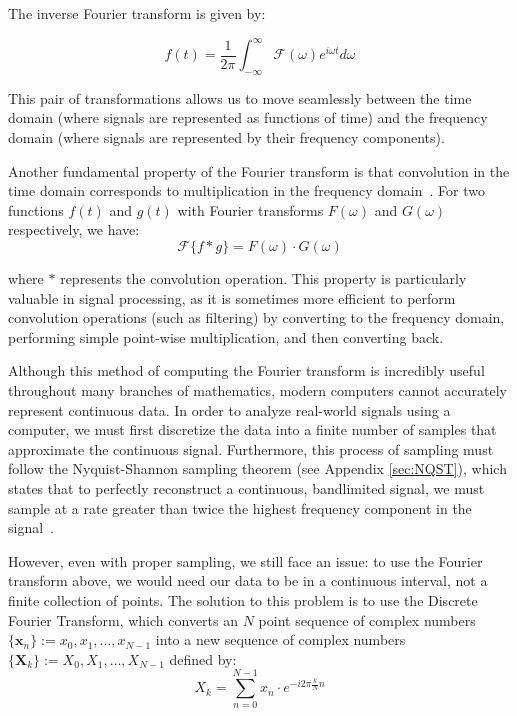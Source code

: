 \documentclass[11pt,twoside]{report}
\numberwithin{thm}{section}
\numberwithin{equation}{section}
\begin{document}
The inverse Fourier transform is given by:

\begin{equation}
  f(t) = \frac{1}{2\pi}\int_{-\infty}^{\infty} \mathcal{F}(\omega) e^{i\omega t} d\omega  
\end{equation}

This pair of transformations allows us to move seamlessly between the time domain (where signals are represented as functions of time) and the frequency domain (where signals are represented by their frequency components).

Another fundamental property of the Fourier transform is that convolution in the time domain corresponds to multiplication in the frequency domain~\cite{BLACKLEDGE200530}. For two functions $f(t)$ and $g(t)$ with Fourier transforms $F(\omega)$ and $G(\omega)$ respectively, we have:
\begin{equation}
\label{eq:conv}
  \mathcal{F}\{f \ast g\} = F(\omega) \cdot G(\omega)  
\end{equation}

where $\ast$ represents the convolution operation. This property is particularly valuable in signal processing, as it is sometimes more efficient to perform convolution operations (such as filtering) by converting to the frequency domain, performing simple point-wise multiplication, and then converting back.

Although this method of computing the Fourier transform is incredibly useful throughout many branches of mathematics, modern computers cannot accurately represent continuous data. In order to analyze real-world signals using a computer, we must first discretize the data into a finite number of samples that approximate the continuous signal. Furthermore, this process of sampling must follow the Nyquist-Shannon sampling theorem (see Appendix \ref{sec:NQST}), which states that to perfectly reconstruct a continuous, bandlimited signal, we must sample at a rate greater than twice the highest frequency component in the signal~\cite{Shannon1949}.

However, even with proper sampling, we still face an issue: to use the Fourier transform above, we would need our data to be in a continuous interval, not a finite collection of points. The solution to this problem is to use the Discrete Fourier Transform, which converts an $N$ point sequence of complex numbers $\{\mathbf{x}_n\} := x_0, x_1, \dots, x_{N-1}$ into a new sequence of complex numbers $\{\mathbf{X}_k\} := X_0, X_1, \dots, X_{N-1}$ defined by:
\begin{equation}
  X_k = \sum_{n=0}^{N-1}x_n \cdot e^{-i2\pi\frac{k}{N}n}  
\end{equation}
\end{document}
